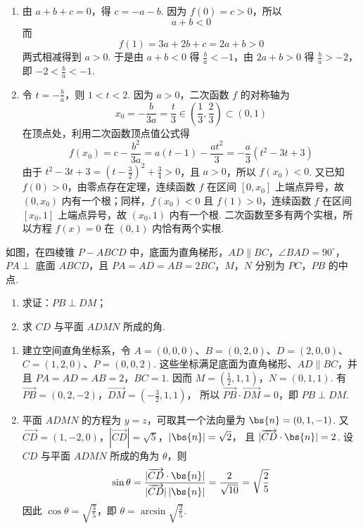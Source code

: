 \begin{solution}
\begin{enumerate}
\item
由 \(a+b+c=0\)，得 \(c=-a-b\). 因为 \(f(0)=c>0\)，所以
\[
a+b<0
\]
而
\[
f(1)=3a+2b+c=2a+b>0
\]
两式相减得到 \(a>0\). 于是由 \(a+b<0\) 得 \(\frac ba<-1\)，由 \(2a+b>0\) 得 \(\frac ba>-2\)，即 \(-2<\frac ba<-1\).

\item
令 \(t=-\frac ba\)，则 \(1<t<2\). 因为 \(a>0\)，二次函数 \(f\) 的对称轴为
\[
x_0=-\frac{b}{3a}=\frac t3\in\left(\frac13,\frac23\right)\subset(0,1)
\]
在顶点处，利用二次函数顶点值公式得
\[
f(x_0)=c-\frac{b^2}{3a}=a(t-1)-\frac{at^2}{3}=-\frac a3(t^2-3t+3)
\]
由于 \(t^2-3t+3=\left(t-\frac32\right)^2+\frac34>0\)，且 \(a>0\)，所以 \(f(x_0)<0\). 又已知 \(f(0)>0\)，由零点存在定理，连续函数 \(f\) 在区间 \([0,x_0]\) 上端点异号，故 \((0,x_0)\) 内有一个根；同样，\(f(x_0)<0\) 且 \(f(1)>0\)，连续函数 \(f\) 在区间 \([x_0,1]\) 上端点异号，故 \((x_0,1)\) 内有一个根. 二次函数至多有两个实根，所以方程 \(f(x)=0\) 在 \((0,1)\) 内恰有两个实根.
\end{enumerate}
\end{solution}

\begin{problem}
如图，在四棱锥 \(P-ABCD\) 中，底面为直角梯形，\(AD \parallel BC\)，\(\angle BAD = 90^\circ\)，\(PA \perp\) 底面 \(ABCD\)，且 \(PA = AD = AB = 2BC\)，\(M\)，\(N\) 分别为 \(PC\)，\(PB\) 的中点.

\begin{enumerate}
\item 求证：\(PB \perp DM\)；
\item 求 \(CD\) 与平面 \(ADMN\) 所成的角.
\end{enumerate}

\end{problem}

\begin{solution}
\begin{enumerate}
\item
建立空间直角坐标系，令 \(A=(0,0,0)\)、\(B=(0,2,0)\)、\(D=(2,0,0)\)、\(C=(1,2,0)\)、\(P=(0,0,2)\).
这些坐标满足底面为直角梯形、\(AD\parallel BC\)，并且 \(PA=AD=AB=2\)，\(BC=1\). 因而
\(M=\left(\frac12,1,1\right)\)，\(N=(0,1,1)\). 有 \(\overrightarrow{PB}=(0,2,-2)\)，\(\overrightarrow{DM}=\left(-\frac32,1,1\right)\)，
所以 \(\overrightarrow{PB}\cdot\overrightarrow{DM}=0\)，即 \(PB\perp DM\).

\item
平面 \(ADMN\) 的方程为 \(y=z\)，可取其一个法向量为 \(\bs{n}=(0,1,-1)\). 又
\(\overrightarrow{CD}=(1,-2,0)\)，\(|\overrightarrow{CD}|=\sqrt5\)，\(|\bs{n}|=\sqrt2\)，
且 \(|\overrightarrow{CD}\cdot\bs{n}|=2\). 设 \(CD\) 与平面 \(ADMN\) 所成的角为 \(\theta\)，则
\[
\sin\theta=\frac{|\overrightarrow{CD}\cdot\bs{n}|}{|\overrightarrow{CD}|\,|\bs{n}|}=\frac2{\sqrt{10}}=\sqrt{\frac25}
\]
因此 \(\cos\theta=\sqrt{\frac35}\)，即 \(\theta=\arcsin\sqrt{\frac25}\).
\end{enumerate}
\end{solution}

